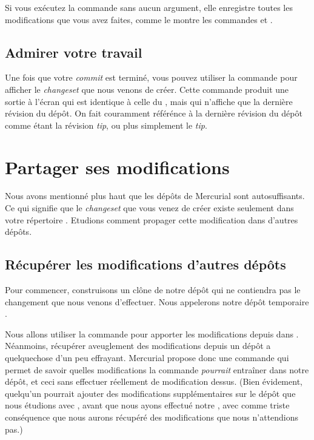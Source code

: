 Si vous exécutez la commande  sans aucun argument, elle
enregistre toutes les modifications que vous avez faites, comme le montre
les commandes  et .

\subsection{Admirer votre travail}

Une fois que votre \textit{commit} est terminé, vous pouvez utiliser
la commande  pour afficher le \textit{changeset} que nous
venons de créer. Cette commande produit une sortie à l'écran qui est
identique à celle du , mais qui n'affiche que la dernière
révision du dépôt.
On fait couramment référénce à la dernière révision du dépôt comme
étant la révision \textit{tip}, ou plus simplement le \textit{tip}.

\section{Partager ses modifications}

Nous avons mentionné plus haut que les dépôts de Mercurial 
sont autosuffisants. Ce qui signifie que le \textit{changeset} 
que vous venez de créer existe seulement dans votre répertoire 
. Etudions comment propager cette modification
dans d'autres dépôts.

\subsection{Récupérer les modifications d'autres dépôts}
\label{sec:tour:pull}

Pour commencer, construisons un clône de notre dépôt  
qui ne contiendra pas le changement que nous venons d'effectuer. Nous
appelerons notre dépôt temporaire .

Nous allons utiliser la commande  pour apporter les 
modifications depuis  dans .
Néanmoins, récupérer aveuglement des modifications depuis un dépôt
a quelquechose d'un peu effrayant. Mercurial propose donc une 
commande  qui permet de savoir quelles modifications
la commande  \emph{pourrait} entraîner dans notre dépôt,
et ceci sans effectuer réellement de modification dessus.
(Bien évidement, quelqu'un pourrait ajouter des modifications
supplémentaires sur le dépôt que nous étudions avec ,
avant que nous ayons effectué notre , avec comme 
triste conséquence que nous aurons récupéré des modifications que 
nous n'attendions pas.)

